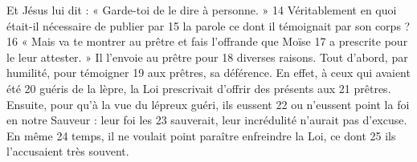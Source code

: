 Et Jésus lui dit : « Garde-toi de le dire à personne. »	 
14	 	Véritablement en quoi était-il nécessaire de publier par	 
15	 	la parole ce dont il témoignait par son corps ?	 
16	 	« Mais va te montrer au prêtre et fais l'offrande que Moïse	 
17	 	a prescrite pour le leur attester. » Il l'envoie au prêtre pour	 
18	 	diverses raisons. Tout d'abord, par humilité, pour témoigner	 
19	 	aux prêtres, sa déférence. En effet, à ceux qui avaient été	 
20	 	guéris de la lèpre, la Loi prescrivait d'offrir des présents aux	 
21	 	prêtres. Ensuite, pour qu'à la vue du lépreux guéri, ils eussent	 
22	 	ou n'eussent point la foi en notre Sauveur : leur foi les	 
23	 	sauverait, leur incrédulité n'aurait pas d'excuse. En même	 
24	 	temps, il ne voulait point paraître enfreindre la Loi, ce dont	 
25	 	ils l'accusaient très souvent.